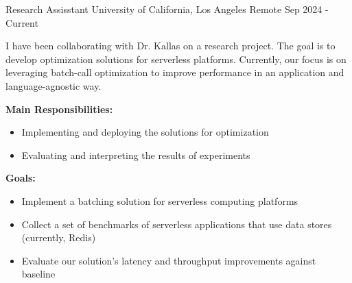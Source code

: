 

\begin{cventries}
  \cventry
  {Research Assisstant}
  {University of California, Los Angeles}
  {Remote}
  {Sep 2024 - Current}
  {
    \begin{cvitems}
    \item {I have been collaborating with Dr. Kallas on a research project. The
        goal is to develop optimization solutions for serverless platforms.
        Currently, our focus is on leveraging batch-call optimization to improve
        performance in an application and language-agnostic way.}
    \item {\textbf{Main Responsibilities:}
        \begin{itemize}[label=-]
        \item Implementing and deploying the solutions for optimization
        \item Evaluating and interpreting the results of experiments
        \end{itemize}
      }
    \item {\textbf{Goals:}
        \begin{itemize}[label=-]
        \item Implement a batching solution for serverless computing platforms
        \item Collect a set of benchmarks of serverless applications that use
          data stores (currently, Redis)
        \item Evaluate our solution’s latency and throughput improvements against baseline
        \end{itemize}
      }
    \end{cvitems}
  }


\end{cventries}
